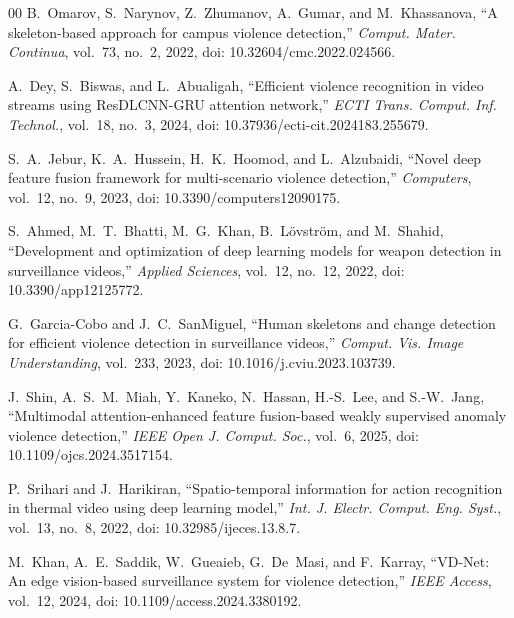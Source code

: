 \documentclass[conference]{IEEEtran}
\begin{document}
\begin{thebibliography}{00}
 B.~Omarov, S.~Narynov, Z.~Zhumanov, A.~Gumar, and M.~Khassanova, ``A skeleton-based approach for campus violence detection,'' \textit{Comput. Mater. Continua}, vol.~73, no.~2, 2022, doi: 10.32604/cmc.2022.024566.

 A.~Dey, S.~Biswas, and L.~Abualigah, ``Efficient violence recognition in video streams using ResDLCNN-GRU attention network,'' \textit{ECTI Trans. Comput. Inf. Technol.}, vol.~18, no.~3, 2024, doi: 10.37936/ecti-cit.2024183.255679.

 S.~A.~Jebur, K.~A.~Hussein, H.~K.~Hoomod, and L.~Alzubaidi, ``Novel deep feature fusion framework for multi-scenario violence detection,'' \textit{Computers}, vol.~12, no.~9, 2023, doi: 10.3390/computers12090175.

 S.~Ahmed, M.~T.~Bhatti, M.~G.~Khan, B.~L\"{o}vstr\"{o}m, and M.~Shahid, ``Development and optimization of deep learning models for weapon detection in surveillance videos,'' \textit{Applied Sciences}, vol.~12, no.~12, 2022, doi: 10.3390/app12125772.

 G.~Garcia-Cobo and J.~C.~SanMiguel, ``Human skeletons and change detection for efficient violence detection in surveillance videos,'' \textit{Comput. Vis. Image Understanding}, vol.~233, 2023, doi: 10.1016/j.cviu.2023.103739.

 J.~Shin, A.~S.~M.~Miah, Y.~Kaneko, N.~Hassan, H.-S.~Lee, and S.-W.~Jang, ``Multimodal attention-enhanced feature fusion-based weakly supervised anomaly violence detection,'' \textit{IEEE Open J. Comput. Soc.}, vol.~6, 2025, doi: 10.1109/ojcs.2024.3517154.

 P.~Srihari and J.~Harikiran, ``Spatio-temporal information for action recognition in thermal video using deep learning model,'' \textit{Int. J. Electr. Comput. Eng. Syst.}, vol.~13, no.~8, 2022, doi: 10.32985/ijeces.13.8.7.

 M.~Khan, A.~E.~Saddik, W.~Gueaieb, G.~De~Masi, and F.~Karray, ``VD-Net: An edge vision-based surveillance system for violence detection,'' \textit{IEEE Access}, vol.~12, 2024, doi: 10.1109/access.2024.3380192.

\end{thebibliography}
\end{document}
